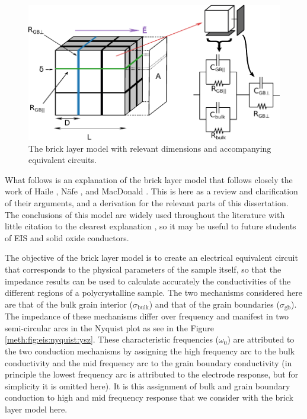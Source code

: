 

\begin{figure}
    \centering
    \includegraphics{Figures/brickLayerModel.pdf}
    \caption{The brick layer model with relevant dimensions and accompanying equivalent circuits.}
    \label{fig:appd:a:bricklayermodel}
\end{figure}
What follows is an explanation of the brick layer model that follows closely the work of Haile \cite{Haile1998}, N\"{a}fe \cite{Nafe1984}, and MacDonald \cite{Barsoukov2005}. This is here as a review and clarification of their arguments, and a derivation for the relevant parts of this dissertation. The conclusions of this model are widely used throughout the literature with little citation to the clearest explanation \cite{Bohn2000, Hossain2018, Chen2011}, so it may be useful to future students of EIS and solid oxide conductors.

The objective of the brick layer model is to create an electrical equivalent circuit that corresponds to the physical parameters of the sample itself, so that the impedance results can be used to calculate accurately the conductivities of the different regions of a polycrystalline sample. The two mechanisms considered here are that of the bulk grain interior ($\sigma_{\mathrm{bulk}}$) and that of the grain boundaries ($\sigma_{\mathrm{gb}}$). The impedance of these mechanisms differ over frequency and manifest in two semi-circular arcs in the Nyquist plot as see in the Figure \ref{meth:fig:eis:nyquist:ysz}. These characteristic frequencies ($\omega_0$) are attributed to the two conduction mechanisms by assigning the high frequency arc to the bulk conductivity and the mid frequency arc to the grain boundary conductivity (in principle the lowest frequency arc is attributed to the electrode response, but for simplicity it is omitted here). It is this assignment of bulk and grain boundary conduction to high and mid frequency response that we consider with the brick layer model here. 

